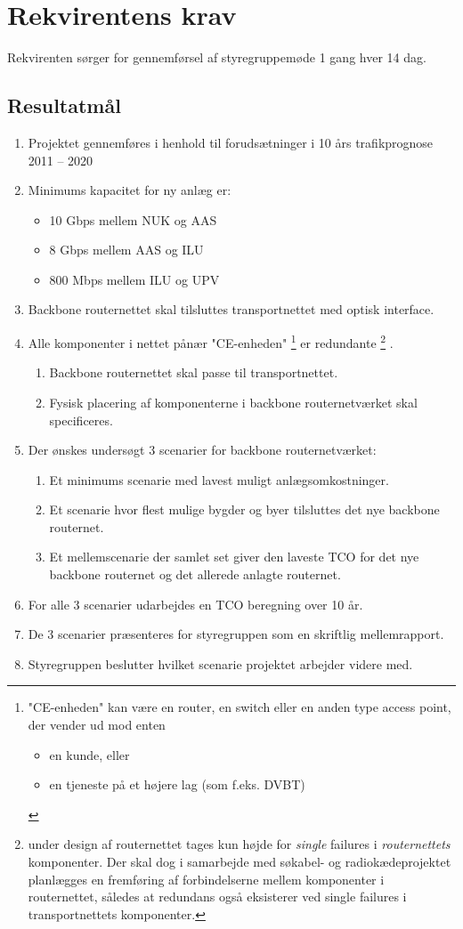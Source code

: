 \documentclass[11pt,a4paper]{article}
\begin{document}
\section{Rekvirentens krav}
 Rekvirenten sørger for gennemførsel af styregruppemøde 1 gang hver 14 dag.
\subsection{Resultatmål}
\begin{enumerate}
\item Projektet gennemføres i henhold til forudsætninger i 10 års trafikprognose 2011 – 2020
\item Minimums kapacitet for ny anlæg er:
\begin{itemize}
\item 10 Gbps mellem NUK og AAS
\item 8 Gbps mellem AAS og ILU
\item 800 Mbps mellem ILU og UPV
\end{itemize}
\item Backbone routernettet skal tilsluttes transportnettet med optisk interface.
\item Alle komponenter i nettet pånær "CE-enheden"
\footnote{
"CE-enheden" kan være en router, en switch eller en anden type access point, der vender ud mod enten
\begin{itemize}
\item en kunde, eller
\item en tjeneste på et højere lag (som f.eks. DVBT)
\end{itemize}
}
er redundante
\footnote{
under design af routernettet tages kun højde for {\em single} failures i {\em routernettets} komponenter. Der skal dog i samarbejde med søkabel- og radiokædeprojektet planlægges en fremføring af forbindelserne mellem komponenter i routernettet, således at redundans også eksisterer ved single failures i transportnettets komponenter.
}
.
\begin{enumerate}
\item Backbone routernettet skal passe til transportnettet.
\item Fysisk placering af komponenterne i backbone routernetværket skal specificeres.
\end{enumerate}
\item Der ønskes undersøgt 3 scenarier for backbone routernetværket:
\begin{enumerate}
\item Et minimums scenarie med lavest muligt anlægsomkostninger.
\item Et scenarie hvor flest mulige bygder og byer tilsluttes det nye backbone routernet.
\item Et mellemscenarie der samlet set giver den laveste TCO for det nye backbone routernet og det allerede anlagte routernet.
\end{enumerate}
\item For alle 3 scenarier udarbejdes en TCO beregning over 10 år.
\item De 3 scenarier præsenteres for styregruppen som en skriftlig mellemrapport.
\item Styregruppen beslutter hvilket scenarie projektet arbejder videre med.
\end{enumerate}
\end{document}
